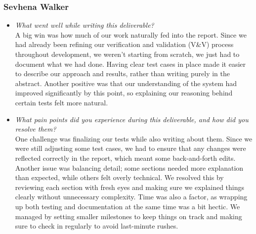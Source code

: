 \documentclass[12pt, titlepage]{article}
\begin{document}
\subsubsection*{Sevhena Walker}
\begin{itemize}
  \item \textit{What went well while writing this deliverable?} \\

    A big win was how much of our work naturally fed into the report.
    Since we had already been refining our verification and
    validation (V\&V) process throughout development, we weren’t
    starting from scratch, we just had to document what we had done.
    Having clear test cases in place made it easier to describe our
    approach and results, rather than writing purely in the abstract.
    Another positive was that our understanding of the system had
    improved significantly by this point, so explaining our reasoning
    behind certain tests felt more natural.

  \item \textit{What pain points did you experience during this
    deliverable, and how did you resolve them?}\\

    One challenge was finalizing our tests while also writing about
    them. Since we were still adjusting some test cases, we had to
    ensure that any changes were reflected correctly in the report,
    which meant some back-and-forth edits. Another issue was
    balancing detail; some sections needed more explanation than
    expected, while others felt overly technical. We resolved this by
    reviewing each section with fresh eyes and making sure we
    explained things clearly without unnecessary complexity. Time was
    also a factor, as wrapping up both testing and documentation at
    the same time was a bit hectic. We managed by setting smaller
    milestones to keep things on track and making sure to check in
    regularly to avoid last-minute rushes.
\end{itemize}
\end{document}
